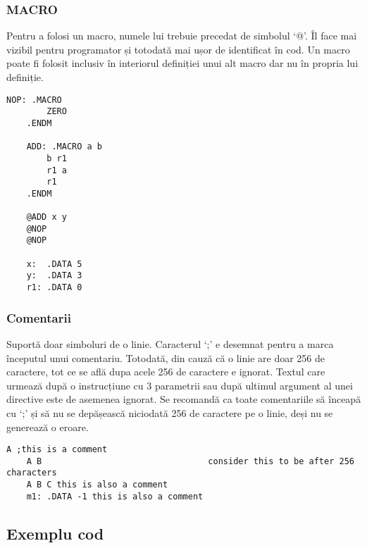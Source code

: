 \documentclass[../main.tex]{subfiles}
\begin{document}
\subsubsection{MACRO}
Pentru a folosi un macro, numele lui trebuie precedat de simbolul `@'. Îl face mai vizibil pentru programator 
și totodată mai ușor de identificat în cod. Un macro poate fi folosit inclusiv în interiorul definiției unui alt
macro dar nu în propria lui definiție.
\begin{lstlisting}[caption={Exemplu macro}, label={lst:macro}]
    NOP: .MACRO
        ZERO
    .ENDM

    ADD: .MACRO a b
        b r1
        r1 a
        r1
    .ENDM

    @ADD x y
    @NOP
    @NOP

    x:  .DATA 5
    y:  .DATA 3
    r1: .DATA 0
\end{lstlisting}

\subsubsection{Comentarii}
Suportă doar simboluri de o linie. Caracterul `;' e desemnat pentru a marca începutul unui comentariu. Totodată,
din cauză că o linie are doar 256 de caractere, tot ce se află dupa acele 256 de caractere e ignorat. Textul care urmează
după o instrucțiune cu 3 parametrii sau după ultimul argument al unei directive este de asemenea ignorat. Se recomandă
ca toate comentariile să înceapă cu `;' și să nu se depășească niciodată 256 de caractere pe o linie, deși nu se
generează o eroare.

\noindent\begin{minipage}{\linewidth}
\begin{lstlisting}[caption={Exemplu de comentarii}, label={lst:comment}]
    A ;this is a comment
    A B                                 consider this to be after 256 characters
    A B C this is also a comment
    m1: .DATA -1 this is also a comment
\end{lstlisting}
\end{minipage}

\subsection{Exemplu cod}
\end{document}
